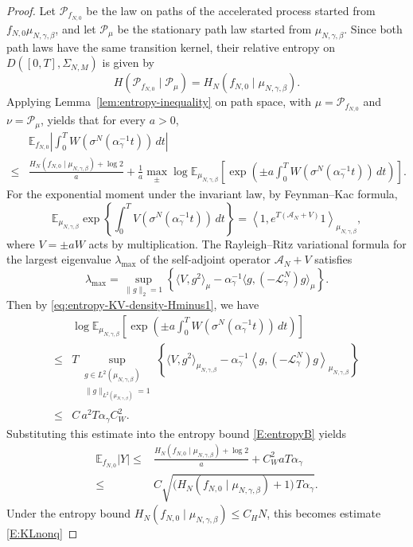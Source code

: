 \documentclass{article}
\begin{document}
\begin{proof}
Let \(\mathcal P_{f_{N,0}}\) be the law on paths of the accelerated process
started from \(f_{N,0}\mu_{N,\gamma,\beta}\), and let
\(\mathcal P_{\mu}\) be the stationary path law started from
\(\mu_{N,\gamma,\beta}\).  Since both path laws have the same transition
kernel, their relative entropy on \(D([0,T],\Sigma_{N,M})\) is given by
\[
H(\mathcal P_{f_{N,0}}\mid\mathcal P_{\mu})
=
H_N(f_{N,0}\mid\mu_{N,\gamma,\beta}).
\]
Applying Lemma~\ref{lem:entropy-inequality} on path space, with
\(\mu=\mathcal P_{f_{N,0}}\) and \(\nu=\mathcal P_{\mu}\), yields that for every
\(a>0\),
\begin{align}\label{E:entropyB}
    & \mathbb E_{f_{N,0}}
\left| \int_0^T W(\sigma^N(\alpha_\gamma^{-1}t))\,dt \right| \nonumber \\
\le & \frac{H_N(f_{N,0}\mid \mu_{N,\gamma,\beta})+\log 2}{a}
+
\frac{1}{a}
\max_{\pm}
\log \mathbb E_{\mu_{N,\gamma,\beta}}
\left[
\exp\!\left(
\pm a\int_0^T W(\sigma^N(\alpha_\gamma^{-1}t))\,dt
\right)
\right].
\end{align}
For the exponential moment under the invariant law, by Feynman--Kac formula,
\[
\mathbb E_{\mu_{N,\gamma,\beta}}
\exp\left\{
\int_0^T V(\sigma^N(\alpha_\gamma^{-1}t))\,dt
\right\}
=
\left\langle
1,e^{T(\mathscr A_N+V)}1
\right\rangle_{\mu_{N,\gamma,\beta}},
\]
where \(V=\pm aW\) acts by multiplication.
The Rayleigh--Ritz variational
formula for the largest eigenvalue $\lambda_{\max} $ of the self-adjoint operator \(\mathscr A_N+V\) satisfies
\[
\lambda_{\max} = \sup_{\|g\|_2=1}
\left\{ \langle V,g^2\rangle_\mu -
\alpha_\gamma^{-1} \langle g,(-\mathscr L_\gamma^N)g\rangle_\mu \right\}.
\]
Then by \eqref{eq:entropy-KV-density-Hminus1}, we have 
\begin{align}
&\log
\mathbb E_{\mu_{N,\gamma,\beta}} \left[ \exp\!\left( \pm a\int_0^T W(\sigma^N(\alpha_\gamma^{-1}t))\,dt \right) \right]
\\
\le & T \sup_{\substack{g\in L^2(\mu_{N,\gamma,\beta})\\
\|g\|_{L^2(\mu_{N,\gamma,\beta})}=1}}
\left\{ \langle V,g^2\rangle_{\mu_{N,\gamma,\beta}}
-
\alpha_\gamma^{-1} \left\langle g,(-\mathscr L_\gamma^N)g \right\rangle_{\mu_{N,\gamma,\beta}} \right\} \nonumber \\
\le & C\,a^2T\alpha_{\gamma} C_{W}^2.
\end{align}
Substituting this estimate into the entropy bound \eqref{E:entropyB} yields
\begin{align*}
    \mathbb E_{f_{N,0}}|Y|
\le &
\frac{H_N(f_{N,0}\mid \mu_{N,\gamma,\beta})+\log 2}{a}
+
C^2_{W}aT\alpha_{\gamma} \\
\leq & C
\sqrt{
\bigl(H_N(f_{N,0}\mid \mu_{N,\gamma,\beta})+1\bigr)\, T  \alpha_{\gamma}}.
\end{align*}
Under the entropy bound \(H_N(f_{N,0}\mid \mu_{N,\gamma,\beta})\le C_HN\), this becomes estimate \eqref{E:KLnonq}
\end{proof}
\end{document}
